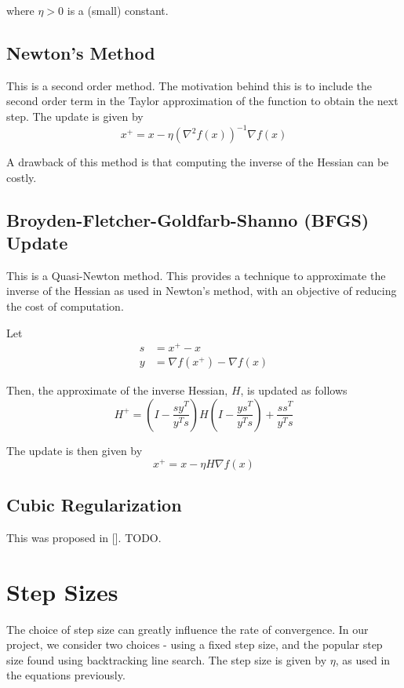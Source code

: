 \documentclass{article}
\begin{document}
where $\eta > 0$ is a (small) constant.

\subsection{Newton's Method}
This is a second order method. The motivation behind this is to include the second order term in the Taylor approximation of the function to obtain the next step. The update is given by
\begin{equation}
x^+ = x - \eta \left(\nabla^2 f(x) \right)^{-1}\nabla f(x)
\end{equation}

A drawback of this method is that computing the inverse of the Hessian can be costly.

\subsection{Broyden-Fletcher-Goldfarb-Shanno (BFGS) Update}
This is a Quasi-Newton method. This provides a technique to approximate the inverse of the Hessian as used in Newton's method, with an objective of reducing the cost of computation.

Let
\begin{align}
s &= x^+ - x \\
y &= \nabla f(x^+) - \nabla f(x)
\end{align}

Then, the approximate of the inverse Hessian, $H$, is updated as follows
\begin{equation}
H^+ = \left(I - \frac{sy^T}{y^Ts}\right)H\left(I-\frac{ys^T}{y^Ts}\right)+\frac{ss^T}{y^Ts}
\end{equation}

The update is then given by
\begin{equation}
x^+ = x - \eta H \nabla f(x)
\end{equation}

\subsection{Cubic Regularization}
This was proposed in []. TODO.

\section{Step Sizes}\label{step}
The choice of step size can greatly influence the rate of convergence. In our project, we consider two choices - using a fixed step size, and the popular step size found using backtracking line search. The step size is given by $\eta$, as used in the equations previously.
\end{document}
